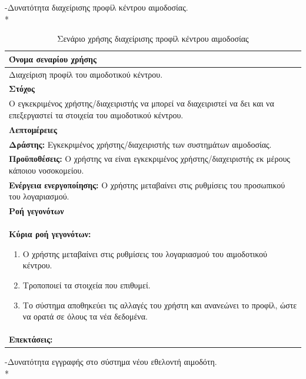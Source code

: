 \newpage
-Δυνατότητα διαχείρισης προφίλ κέντρου αιμοδοσίας.
\\*

\begin{table}[H]
	\begin{center}
	    \begin{tabular}{|p{\dimexpr \linewidth-2\tabcolsep}|}
	    \hline
	    \rowcolor{grayy}
	    \textbf{Όνομα σεναρίου χρήσης}
	    \\ \hline    
	    Διαχείριση προφίλ του αιμοδοτικού κέντρου. 
	     \\ \hline
	    \rowcolor{grayy}
	    \textbf{\textbf{Στόχος}}
	    \\ \hline
	 	 Ο εγκεκριμένος χρήστης/διαχειριστής να μπορεί να διαχειριστεί να δει και να επεξεργαστεί τα στοιχεία του αιμοδοτικού κέντρου.
	    \\ \hline
	    \rowcolor{grayy}
	    \textbf{Λεπτομέρειες}
	    \\ \hline
		\textbf{Δράστης:} Εγκεκριμένος χρήστης/διαχειριστής των συστημάτων αιμοδοσίας.
		\\*
		\textbf{Προϋποθέσεις:} Ο χρήστης να είναι εγκεκριμένος χρήστης/διαχειριστής εκ μέρους κάποιου νοσοκομείου.
		\\*
		\textbf{Ενέργεια ενεργοποίησης:} Ο χρήστης μεταβαίνει στις ρυθμίσεις του προσωπικού του λογαριασμού.
		\\ \hline
		\rowcolor{grayy}    
	    \textbf{Ροή γεγονότων}
	    \\ \hline
		\textbf{Κύρια ροή γεγονότων:}
		\begin{enumerate}
			\item	 Ο χρήστης μεταβαίνει στις ρυθμίσεις του λογαριασμού του αιμοδοτικού κέντρου.
			\item Τροποποιεί τα στοιχεία που επιθυμεί.
			\item Το σύστημα αποθηκεύει τις αλλαγές του χρήστη και ανανεώνει το προφίλ, ώστε να ορατά σε όλους τα νέα δεδομένα.
		\end{enumerate}
		\\ \hline
		\rowcolor{grayy}
		\textbf{Επεκτάσεις:}
		   \\ \hline
	    \end{tabular}
	    \caption{Σενάριο χρήσης διαχείρισης προφίλ κέντρου αιμοδοσίας}
	    \label{tab:blood_center_account_management}
	\end{center}
\end{table}	

\newpage
-Δυνατότητα εγγραφής στο σύστημα νέου εθελοντή αιμοδότη.
\\*	

